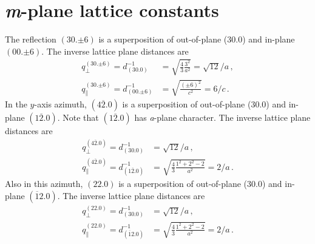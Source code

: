 \section{\textit{m}-plane lattice constants}
\label{Sec:App_Calc_mPlane}
The reflection $(30.{\pm6})$ is a superposition of out-of-plane (30.0) and in-plane $(00.{\pm6})$.
The inverse lattice plane distances are
\begin{align}
    q_\perp^{(30.{\pm6})}=
    d_{(30.0)}^{-1} &=
    \sqrt{\frac{4}{3}\frac{3^2}{a^2}}
    =\sqrt{12}/a\,,\\
    q_\parallel^{(30.{\pm6})}=
    d_{(00.{\pm6})}^{-1} &=
    \sqrt{\frac{(\pm6)^2}{c^2}}
    =6/c\,.
\end{align}
In the $y$-axis azimuth, $(4\overline{2}.0)$ is a superposition of out-of-plane (30.0) and in-plane $(1\overline{2}.0)$.
Note that $(1\overline{2}.0)$ has \textit{a}-plane character.
The inverse lattice plane distances are
\begin{align}
    q_\perp^{(4\overline{2}.0)}=
    d_{(30.0)}^{-1} &= \sqrt{12}/a\,,\\
    q_\parallel^{(4\overline{2}.0)}=
    d_{(1\overline{2}.0)}^{-1} &=
    \sqrt{\frac{4}{3}\frac{1^2+2^2-2}{a^2}}
    = 2/a\,.
\end{align}
Also in this azimuth, $(22.0)$ is a superposition of out-of-plane (30.0) and in-plane $(\overline{1}2.0)$.
The inverse lattice plane distances are
\begin{align}
    q_\perp^{(22.0)}=
    d_{(30.0)}^{-1} &= \sqrt{12}/a\,,\\
    q_\parallel^{(22.0)}=
    d_{(\overline{1}2.0)}^{-1} &=
    \sqrt{\frac{4}{3}\frac{1^2+2^2-2}{a^2}}
    = 2/a\,.
\end{align}

